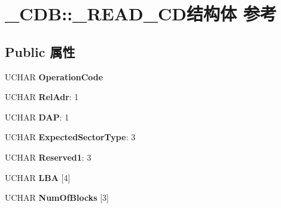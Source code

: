 \hypertarget{struct___c_d_b_1_1___r_e_a_d___c_d}{}\section{\+\_\+\+C\+DB\+:\+:\+\_\+\+R\+E\+A\+D\+\_\+\+C\+D结构体 参考}
\label{struct___c_d_b_1_1___r_e_a_d___c_d}
\subsection*{Public 属性}
\begin{DoxyCompactItemize}
\item 
\mbox{\label{struct___c_d_b_1_1___r_e_a_d___c_d_af9279552f24b30a8b030776f032b59da}} 
U\+C\+H\+AR {\bfseries Operation\+Code}
\item 
\mbox{\label{struct___c_d_b_1_1___r_e_a_d___c_d_a1c617184c38f6c384ab59ac561f6c074}} 
U\+C\+H\+AR {\bfseries Rel\+Adr}\+: 1
\item 
\mbox{\label{struct___c_d_b_1_1___r_e_a_d___c_d_a6b73ec7524aa6de8e86d6028e5bf90ec}} 
U\+C\+H\+AR {\bfseries D\+AP}\+: 1
\item 
\mbox{\label{struct___c_d_b_1_1___r_e_a_d___c_d_a7cbf8ada36dc9ca540afed3b6c55f8af}} 
U\+C\+H\+AR {\bfseries Expected\+Sector\+Type}\+: 3
\item 
\mbox{\label{struct___c_d_b_1_1___r_e_a_d___c_d_a6b503c678f2f8133e6cf8fa0d7bce149}} 
U\+C\+H\+AR {\bfseries Reserved1}\+: 3
\item 
\mbox{\label{struct___c_d_b_1_1___r_e_a_d___c_d_a1d0d80ed836c342a047ddd28b6e2f519}} 
U\+C\+H\+AR {\bfseries L\+BA} \mbox{[}4\mbox{]}
\item 
\mbox{\label{struct___c_d_b_1_1___r_e_a_d___c_d_a4478ba227abf5cbf9a699758667f9d39}} 
U\+C\+H\+AR {\bfseries Num\+Of\+Blocks} \mbox{[}3\mbox{]}
\item 
\mbox{\label{struct___c_d_b_1_1___r_e_a_d___c_d_a1dfb5d33a827ad2d7dda5c4c63add109}} 

\end{DoxyCompactItemize}
